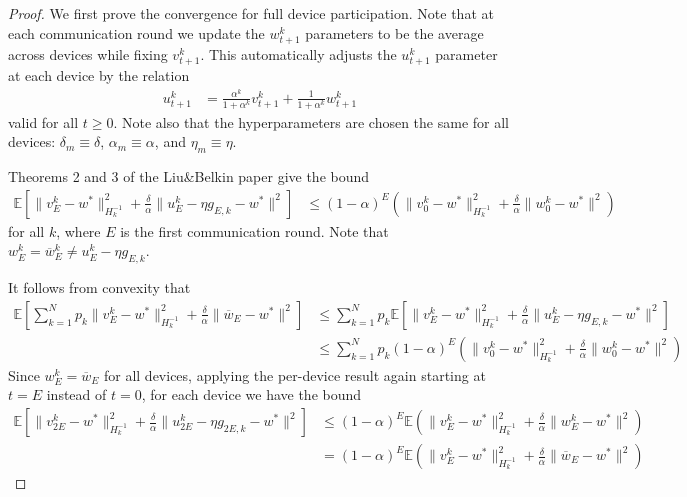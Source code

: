 \begin{proof}
	We first prove the convergence for full device participation. Note
	that at each communication round we update the $w_{t+1}^{k}$ parameters
	to be the average across devices while fixing $v_{t+1}^{k}$. This
	automatically adjusts the $u_{t+1}^{k}$ parameter at each device
	by the relation 
	\begin{align*}
	u_{t+1}^{k} & =\frac{\alpha^{k}}{1+\alpha^{k}}v_{t+1}^{k}+\frac{1}{1+\alpha^{k}}w_{t+1}^{k}
	\end{align*}
	valid for all $t\geq0$. Note also that the hyperparameters are chosen
	the same for all devices: $\delta_{m}\equiv\delta$, $\alpha_{m}\equiv\alpha$,
	and $\eta_{m}\equiv\eta$. 
	
	Theorems 2 and 3 of the Liu\&Belkin paper give the bound 
	\begin{align*}
	\mathbb{E}\left[\|v_{E}^{k}-w^{\ast}\|_{H_{k}^{-1}}^{2}+\frac{\delta}{\alpha}\|u_{E}^{k}-\eta g_{E,k}-w^{\ast}\|^{2}\right] & \leq(1-\alpha)^{E}(\|v_{0}^{k}-w^{\ast}\|_{H_{k}^{-1}}^{2}+\frac{\delta}{\alpha}\|w_{0}^{k}-w^{\ast}\|^{2})
	\end{align*}
	for all $k$, where $E$ is the first communication round. Note that
	$w_{E}^{k}=\overline{w}_{E}^{k}\neq u_{E}^{k}-\eta g_{E,k}$.
	
	It follows from convexity that 
	\begin{align*}
	\mathbb{E}\left[\sum_{k=1}^{N}p_{k}\|v_{E}^{k}-w^{\ast}\|_{H_{k}^{-1}}^{2}+\frac{\delta}{\alpha}\|\overline{w}_{E}-w^{\ast}\|^{2}\right] & \leq\sum_{k=1}^{N}p_{k}\mathbb{E}\left[\|v_{E}^{k}-w^{\ast}\|_{H_{k}^{-1}}^{2}+\frac{\delta}{\alpha}\|u_{E}^{k}-\eta g_{E,k}-w^{\ast}\|^{2}\right]\\
	& \leq\sum_{k=1}^{N}p_{k}(1-\alpha)^{E}(\|v_{0}^{k}-w^{\ast}\|_{H_{k}^{-1}}^{2}+\frac{\delta}{\alpha}\|w_{0}^{k}-w^{\ast}\|^{2})
	\end{align*}
	Since $w_{E}^{k}=\overline{w}_{E}$ for all devices, applying the
	per-device result again starting at $t=E$ instead of $t=0$, for
	each device we have the bound
	\begin{align*}
	\mathbb{E}\left[\|v_{2E}^{k}-w^{\ast}\|_{H_{k}^{-1}}^{2}+\frac{\delta}{\alpha}\|u_{2E}^{k}-\eta g_{2E,k}-w^{\ast}\|^{2}\right] & \leq(1-\alpha)^{E}\mathbb{E}(\|v_{E}^{k}-w^{\ast}\|_{H_{k}^{-1}}^{2}+\frac{\delta}{\alpha}\|w_{E}^{k}-w^{\ast}\|^{2})\\
	& =(1-\alpha)^{E}\mathbb{E}(\|v_{E}^{k}-w^{\ast}\|_{H_{k}^{-1}}^{2}+\frac{\delta}{\alpha}\|\overline{w}_{E}-w^{\ast}\|^{2})
	\end{align*}
	

\end{proof}
